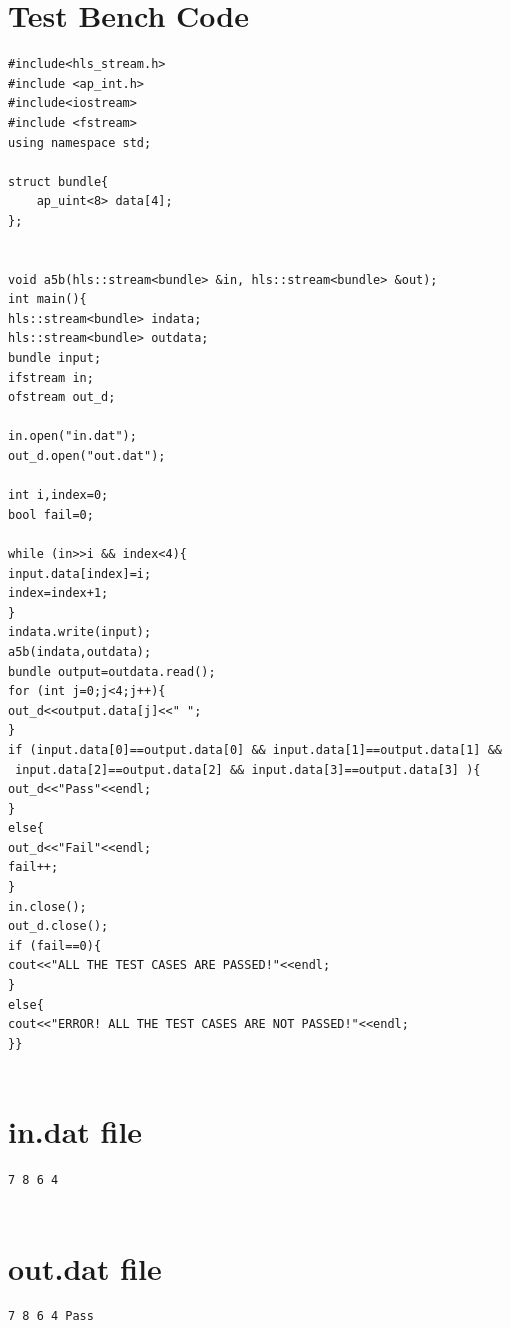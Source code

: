 \documentclass{article}
\begin{document}
\section{Test Bench Code}
\begin{lstlisting}
#include<hls_stream.h>
#include <ap_int.h>
#include<iostream>
#include <fstream>
using namespace std;

struct bundle{
	ap_uint<8> data[4];
};


void a5b(hls::stream<bundle> &in, hls::stream<bundle> &out);
int main(){
hls::stream<bundle> indata;
hls::stream<bundle> outdata;
bundle input;
ifstream in;
ofstream out_d;

in.open("in.dat");
out_d.open("out.dat");

int i,index=0;
bool fail=0;

while (in>>i && index<4){
input.data[index]=i;
index=index+1;
}
indata.write(input);
a5b(indata,outdata);
bundle output=outdata.read();
for (int j=0;j<4;j++){
out_d<<output.data[j]<<" ";
}
if (input.data[0]==output.data[0] && input.data[1]==output.data[1] &&
 input.data[2]==output.data[2] && input.data[3]==output.data[3] ){
out_d<<"Pass"<<endl;
}
else{
out_d<<"Fail"<<endl;
fail++;
}
in.close();
out_d.close();
if (fail==0){
cout<<"ALL THE TEST CASES ARE PASSED!"<<endl;
}
else{
cout<<"ERROR! ALL THE TEST CASES ARE NOT PASSED!"<<endl;
}}


\end{lstlisting}
\vspace{3cm}

\section{in.dat file}
\begin{lstlisting}
7 8 6 4


\end{lstlisting}
\vspace{3cm}
\section{out.dat file}
\begin{lstlisting}
7 8 6 4 Pass


\end{lstlisting}
\vspace{15cm}
\end{document}
